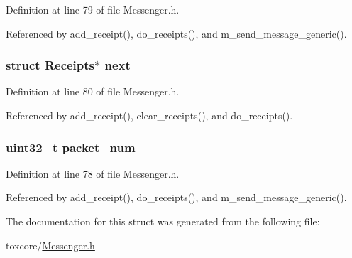 Definition at line 79 of file Messenger.\+h.



Referenced by add\+\_\+receipt(), do\+\_\+receipts(), and m\+\_\+send\+\_\+message\+\_\+generic().

\hypertarget{struct_receipts_a4cf1c9c7aa66ba420c540e3070555c89}{
\subsubsection[{next}]{\setlength{\rightskip}{0pt plus 5cm}struct {\bf Receipts}$\ast$ next}}\label{struct_receipts_a4cf1c9c7aa66ba420c540e3070555c89}


Definition at line 80 of file Messenger.\+h.



Referenced by add\+\_\+receipt(), clear\+\_\+receipts(), and do\+\_\+receipts().

\hypertarget{struct_receipts_a3110fa374a202ca37de05e1bb9c95f17}{
\subsubsection[{packet\+\_\+num}]{\setlength{\rightskip}{0pt plus 5cm}uint32\+\_\+t packet\+\_\+num}}\label{struct_receipts_a3110fa374a202ca37de05e1bb9c95f17}


Definition at line 78 of file Messenger.\+h.



Referenced by add\+\_\+receipt(), do\+\_\+receipts(), and m\+\_\+send\+\_\+message\+\_\+generic().



The documentation for this struct was generated from the following file\+:\begin{DoxyCompactItemize}
\item 
toxcore/\hyperlink{_messenger_8h}{Messenger.\+h}\end{DoxyCompactItemize}
